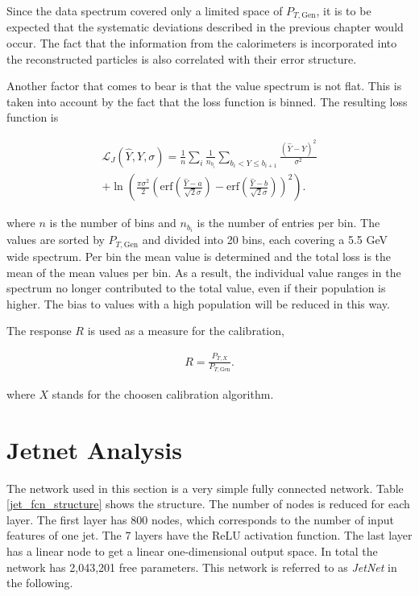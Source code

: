 \documentclass[12pt, a4paper]{thesis}
\begin{document}
Since the data spectrum covered only a limited space of \(P_{T,
  \text{Gen}}\), it is to be expected that the systematic deviations
described in the previous chapter would occur. The fact that the
information from the calorimeters is incorporated into the
reconstructed particles is also correlated with their error structure.

Another factor that comes to bear is that the value spectrum is not
flat. This is taken into account by the fact that the loss function is
binned. The resulting loss function is

\begin{align}
  \mathcal{L}_{J}(\hat Y, Y, \sigma) = \frac{1}{n}
  \sum_{i} \frac{1}{n_{b_i} } \sum_{b_i < Y \leq b_{i+1}} \frac{(\hat
    Y -Y)^2}{\sigma^2} \nonumber \\ +
  \ln(\frac{\pi\sigma^2}{2}\left(\text{erf}\left(\frac{\hat Y-a}{\sqrt{2}\sigma}\right)
  - \text{erf}\left(\frac{\hat Y-b}{\sqrt{2}\sigma}\right)\right)^2).
\end{align}

where $n$ is the number of bins and $n_{b_i}$ is the number of entries
per bin. The values are sorted by \(P_{T, \text{Gen}}\) and divided
into 20 bins, each covering a 5.5 GeV wide spectrum. Per bin the mean
value is determined and the total loss is the mean of the mean values
per bin.  As a result, the individual value ranges in the spectrum no
longer contributed to the total value, even if their population is
higher. The bias to values with a high population will be reduced in
this way.

The response \(R\) is used as a measure for the calibration,

\begin{align}
R = \frac{P_{T, X}}{P_{T, \text{Gen}}}.
\end{align}

where $X$ stands for the choosen calibration algorithm.

\clearpage
\section{Jetnet Analysis}
\label{sec:org03235a3}

The network used in this section is a very simple fully connected
network.  Table \ref{jet_fcn_structure} shows the structure. The
number of nodes is reduced for each layer.  The first layer has 800
nodes, which corresponds to the number of input features of one
jet. The 7 layers have the ReLU activation function. The last layer
has a linear node to get a linear one-dimensional output space. In
total the network has 2,043,201 free parameters. This network is
referred to as \emph{JetNet} in the following.
\end{document}
